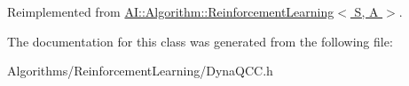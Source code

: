 Reimplemented from \hyperlink{classAI_1_1Algorithm_1_1ReinforcementLearning_a25d7fa245a79e61061436dc0f1db90cb}{A\+I\+::\+Algorithm\+::\+Reinforcement\+Learning$<$ S, A $>$}.



The documentation for this class was generated from the following file\+:\begin{DoxyCompactItemize}
\item 
Algorithms/\+Reinforcement\+Learning/Dyna\+Q\+C\+C.\+h\end{DoxyCompactItemize}
